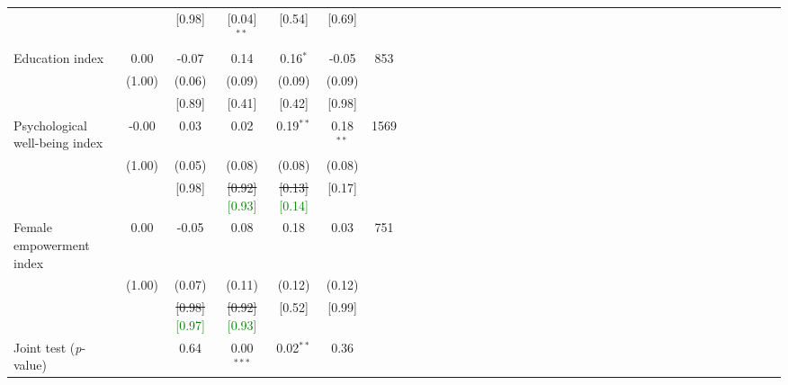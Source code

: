 {\begin{tabular}{l*{6}{SSSSSc}}
          &         &   [0.98]&[0.04]$^{**}$&   [0.54]&   [0.69]&         \\
Education index&     0.00&    -0.07&     0.14&0.16$^{*}$&    -0.05&      853\\
          &   (1.00)&   (0.06)&   (0.09)&   (0.09)&   (0.09)&         \\
          &         &   [0.89]&   [0.41]&   [0.42]&   [0.98]&         \\
Psychological well-being index&    -0.00&     0.03&     0.02&0.19$^{**}$&0.18$^{**}$&     1569\\
          &   (1.00)&   (0.05)&   (0.08)&   (0.08)&   (0.08)&         \\
          &         &   [0.98]&   \sout{[0.92]}\textcolor{green}{[0.93]}&   \sout{[0.13]}\textcolor{green}{[0.14]}&   [0.17]&         \\
Female empowerment index&     0.00&    -0.05&     0.08&     0.18&     0.03&      751\\
          &   (1.00)&   (0.07)&   (0.11)&   (0.12)&   (0.12)&         \\
          &         &   \sout{[0.98]}\textcolor{green}{[0.97]}&   \sout{[0.92]}\textcolor{green}{[0.93]}&   [0.52]&   [0.99]&         \\
\midrule Joint test (\emph{p}-value)&         &     0.64&0.00$^{***}$&0.02$^{**}$&     0.36&         \\
\bottomrule
\end{tabular}
}
